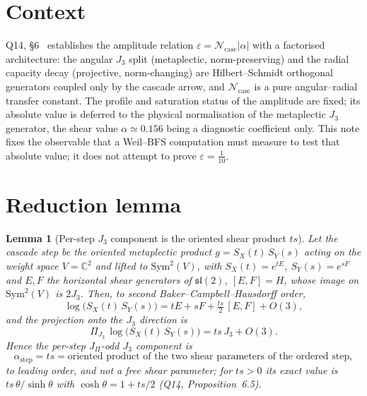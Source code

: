 \documentclass[11pt]{article}
\providecommand{\Sym}{\mathrm{Sym}}
\newtheorem{lemma}{Lemma}
\begin{document}
  \section{Context}

    Q14, \S6~\cite{Beau2026q14} establishes the amplitude relation $\varepsilon = \mathcal{N}_{\mathrm{casc}}
  |\alpha|$ with a factorised architecture: the angular $J_3$ split (metaplectic, norm-preserving) and
    the radial capacity decay (projective, norm-changing) are Hilbert--Schmidt orthogonal generators
    coupled only by the cascade arrow, and $\mathcal{N}_{\mathrm{casc}}$ is a pure angular--radial
    transfer constant.
    The profile and saturation status of the amplitude are fixed; its absolute value is deferred to the
    physical normalisation of the metaplectic $J_3$ generator, the shear value $\alpha \simeq 0.156$ being
    a diagnostic coefficient only.
    This note fixes the observable that a Weil--BFS computation must measure to test that absolute value;
    it does not attempt to prove $\varepsilon = \tfrac{1}{10}$.

  \section{Reduction lemma}

    \begin{lemma}[Per-step $J_3$ component is the oriented shear product $ts$]
      \label{lem:area}
      Let the cascade step be the oriented metaplectic product $g = S_X(t)\,S_Y(s)$ acting on the weight
      space $V = \mathbb{C}^2$ and lifted to $\Sym^2(V)$, with $S_X(t)=e^{tE}$, $S_Y(s)=e^{sF}$ and $E,F$ the
      horizontal shear generators of $\mathfrak{sl}(2)$, $[E,F] = H$, whose image on $\Sym^2(V)$ is $2J_3$.
      Then, to second Baker--Campbell--Hausdorff order,
      \[
        \log\!\big(S_X(t)\,S_Y(s)\big) = tE + sF + \tfrac{ts}{2}\,[E,F] + O(3),
      \]
      and the projection onto the $J_3$ direction is
      \[
        \Pi_{J_3}\,\log\!\big(S_X(t)\,S_Y(s)\big) = ts\, J_3 + O(3).
      \]
      Hence the per-step $J_\Pi$-odd $J_3$ component is
      \[
        \alpha_{\mathrm{step}} = ts = \text{oriented product of the two shear parameters of the ordered step},
      \]
      to leading order, and not a free shear parameter; for $ts>0$ its exact value is $ts\,\theta/\sinh\theta$ with
      $\cosh\theta = 1 + ts/2$ (Q14, Proposition~6.5).
    \end{lemma}
\end{document}
